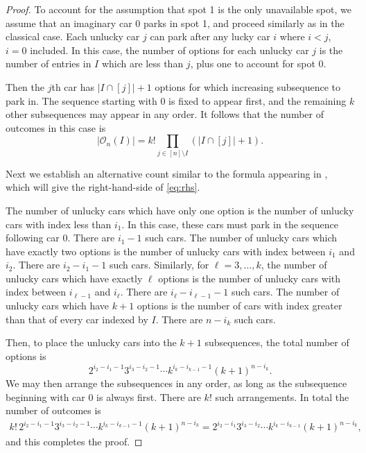\documentclass[reqno]{amsart}
\theoremstyle{definition}
\theoremstyle{remark}
\newcommand{\out}{\mathcal{O}}
\begin{document}
\begin{proof}
To account for the assumption that spot 1 is the only unavailable spot, we assume that an imaginary car 0 parks in spot 1, and proceed similarly as in the classical case. Each unlucky car $j$ can park after any lucky car $i$ where $i<j$, $i=0$ included. In this case, the number of options for each unlucky car $j$ is the number of entries in $I$ which are less than $j$, plus one to account for spot 0.

Then the $j$th car has $|I \cap [j]| + 1$ options for which increasing subsequence to park in. The sequence starting with 0 is fixed to appear first, and the remaining $k$ other subsequences may appear in any order. It follows that the number of outcomes in this case is 
\[
|\out_n(I)|=k! \prod_{j\in [n]\setminus I}( |I\cap [j]|+1).
\]



Next we establish an alternative count similar to the formula appearing in , which will give the right-hand-side of \eqref{eq:rhs}.

The number of unlucky cars which have only one option is the number of unlucky cars with index less than $i_1$. In this case, these cars must park in the sequence following car 0. There are $i_1-1$ such cars.
The number of unlucky cars which have exactly two options is the number of unlucky cars with index between $i_1$ and $i_2$. There are $i_2-i_1-1$ such cars. Similarly, for $\ell = 3,\ldots, k$, the number of unlucky cars which have exactly $\ell$ options is the number of unlucky cars with index between $i_{\ell-1}$ and $i_\ell$. There are $i_\ell-i_{\ell-1}-1$ such cars.
The number of unlucky cars which have $k+1$ options is the number of cars with index greater than {that of} every car indexed by $I$. There are $n-i_k$ such cars.


Then, to place the unlucky cars into the $k+1$ subsequences, the total number of options is
\[
2^{i_2-i_1-1}3^{i_3-i_2-1}\cdots k^{i_{k}-i_{k-1}-1} (k+1)^{n-i_k}.
\]
We may then arrange the subsequences in any order, as long as the subsequence beginning with car 0 is always first. There are $k!$ such arrangements.
In total the number of outcomes is
\begin{align*}
    k!\,2^{i_2-i_1-1}3^{i_3-i_2-1}\cdots k^{i_{k}-i_{k-1}-1} (k+1)^{n-i_k} = 2^{i_2-i_1}3^{i_3-i_2}\cdots k^{i_{k}-i_{k-1}} (k+1)^{n-i_k},
\end{align*}
and this completes the proof.
\end{proof}
\end{document}

